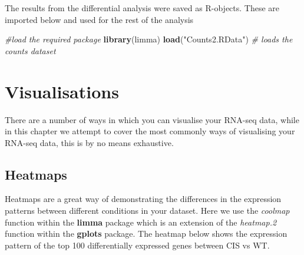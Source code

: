 \documentclass[]{book}
\newenvironment{Shaded}{\begin{snugshade}}{\end{snugshade}}
\newcommand{\CommentTok}[1]{\textcolor[rgb]{0.56,0.35,0.01}{\textit{#1}}}
\newcommand{\DataTypeTok}[1]{\textcolor[rgb]{0.13,0.29,0.53}{#1}}
\newcommand{\DecValTok}[1]{\textcolor[rgb]{0.00,0.00,0.81}{#1}}
\newcommand{\FloatTok}[1]{\textcolor[rgb]{0.00,0.00,0.81}{#1}}
\newcommand{\KeywordTok}[1]{\textcolor[rgb]{0.13,0.29,0.53}{\textbf{#1}}}
\newcommand{\NormalTok}[1]{#1}
\newcommand{\OperatorTok}[1]{\textcolor[rgb]{0.81,0.36,0.00}{\textbf{#1}}}
\newcommand{\StringTok}[1]{\textcolor[rgb]{0.31,0.60,0.02}{#1}}
\begin{document}
The results from the differential analysis were saved as R-objects. These are imported below and used for the rest of the analysis

\begin{Shaded}
\begin{Highlighting}[]
\CommentTok{#load the required package}
\KeywordTok{library}\NormalTok{(limma)}
\KeywordTok{load}\NormalTok{(}\StringTok{"Counts2.RData"}\NormalTok{) }\CommentTok{# loads the counts dataset}
\end{Highlighting}
\end{Shaded}

\hypertarget{visualisations}{%
\section{Visualisations}\label{visualisations}}

There are a number of ways in which you can visualise your RNA-seq data, while in this chapter we attempt to cover the most commonly ways of visualising your RNA-seq data, this is by no means exhaustive.

\hypertarget{heatmaps}{%
\subsection{Heatmaps}\label{heatmaps}}

Heatmaps are a great way of demonstrating the differences in the expression patterns between different conditions in your dataset. Here we use the \emph{coolmap} function within the \textbf{limma}
package which is an extension of the \emph{heatmap.2} function within the \textbf{gplots} package. The heatmap below shows the expression pattern of the top 100 differentially expressed genes between CIS vs WT.

\begin{Shaded}
\end{Shaded}
\end{document}
